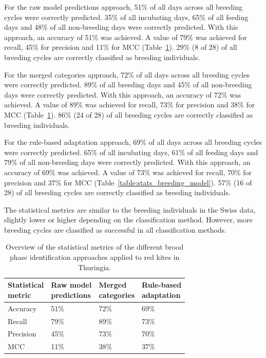 For the raw model predictions approach, 51\% of all days across all breeding cycles were correctly predicted. 35\% of all incubating days, 65\% of all feeding days and 48\% of all non-breeding days were correctly predicted. With this approach, an accuracy of 51\% was achieved. A value of 79\% was achieved for recall, 45\% for precision and 11\% for MCC (Table~\ref{table:stats_breeding_model_pfeiffer}). 29\% (8 of 28) of all breeding cycles are correctly classified as breeding individuals.

For the merged categories approach, 72\% of all days across all breeding cycles were correctly predicted. 89\% of all breeding days and 45\% of all non-breeding days were correctly predicted. With this approach, an accuracy of 72\% was achieved. A value of 89\% was achieved for recall, 73\% for precision and 38\% for MCC (Table~\ref{table:stats_breeding_model_pfeiffer}). 86\% (24 of 28) of all breeding cycles are correctly classified as breeding individuals.

For the rule-based adaptation approach, 69\% of all days across all breeding cycles were correctly predicted. 65\% of all incubating days, 61\% of all feeding days and 79\% of all non-breeding days were correctly predicted. With this approach, an accuracy of 69\% was achieved. A value of 73\% was achieved for recall, 70\% for precision and 37\% for MCC (Table~\ref{table:stats_breeding_model}). 57\% (16 of 28) of all breeding cycles are correctly classified as breeding individuals.

The statistical metrics are similar to the breeding individuals in the Swiss data, slightly lower or higher depending on the classification method. However, more breeding cycles are classified as successful in all classification methods.

\begin{table}[H]
\begin{center}
\caption[Statistical metrics of the different brood phase identification approaches applied to red kites in Thuringia]{Overview of the statistical metrics of the different brood phase identification approaches applied to red kites in Thuringia.}
\label{table:stats_breeding_model_pfeiffer}
\begin{tabular}{| p{3cm} | p{3cm} | p{3cm} | p{3cm} | } 
\cline{1-4}
\textbf{Statistical \newline metric} & \textbf{Raw model \newline predictions} & \textbf{Merged \newline categories} & \textbf{Rule-based \newline adaptation} \\
\hline
Accuracy & 51\% & 72\% & 69\% \\
\hline
Recall & 79\% & 89\% & 73\% \\
\hline
Precision & 45\% & 73\% & 70\% \\
\hline
MCC & 11\% & 38\% & 37\% \\
\hline
\end{tabular}
\end{center}
\end{table}
